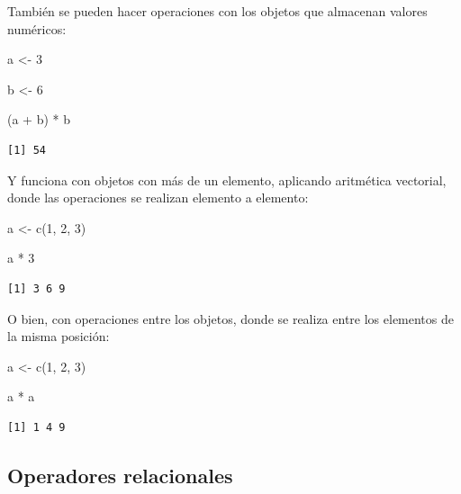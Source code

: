 \documentclass[
  spanish,
  a4paper,
]{scrbook}
\newenvironment{Shaded}{\begin{snugshade}}{\end{snugshade}}
\newcommand{\DecValTok}[1]{\textcolor[rgb]{0.68,0.00,0.00}{#1}}
\newcommand{\FunctionTok}[1]{\textcolor[rgb]{0.28,0.35,0.67}{#1}}
\newcommand{\NormalTok}[1]{\textcolor[rgb]{0.00,0.23,0.31}{#1}}
\newcommand{\OtherTok}[1]{\textcolor[rgb]{0.00,0.23,0.31}{#1}}
\newcommand{\SpecialCharTok}[1]{\textcolor[rgb]{0.37,0.37,0.37}{#1}}
\begin{document}
También se pueden hacer operaciones con los objetos que almacenan
valores numéricos:

\begin{Shaded}
\begin{Highlighting}[]
\NormalTok{a }\OtherTok{\textless{}{-}} \DecValTok{3}

\NormalTok{b }\OtherTok{\textless{}{-}} \DecValTok{6}

\NormalTok{(a }\SpecialCharTok{+}\NormalTok{ b) }\SpecialCharTok{*}\NormalTok{ b}
\end{Highlighting}
\end{Shaded}

\begin{verbatim}
[1] 54
\end{verbatim}

Y funciona con objetos con más de un elemento, aplicando aritmética
vectorial, donde las operaciones se realizan elemento a elemento:

\begin{Shaded}
\begin{Highlighting}[]
\NormalTok{a }\OtherTok{\textless{}{-}} \FunctionTok{c}\NormalTok{(}\DecValTok{1}\NormalTok{, }\DecValTok{2}\NormalTok{, }\DecValTok{3}\NormalTok{)}

\NormalTok{a }\SpecialCharTok{*} \DecValTok{3}
\end{Highlighting}
\end{Shaded}

\begin{verbatim}
[1] 3 6 9
\end{verbatim}

O bien, con operaciones entre los objetos, donde se realiza entre los
elementos de la misma posición:

\begin{Shaded}
\begin{Highlighting}[]
\NormalTok{a }\OtherTok{\textless{}{-}} \FunctionTok{c}\NormalTok{(}\DecValTok{1}\NormalTok{, }\DecValTok{2}\NormalTok{, }\DecValTok{3}\NormalTok{)}

\NormalTok{a }\SpecialCharTok{*}\NormalTok{ a}
\end{Highlighting}
\end{Shaded}

\begin{verbatim}
[1] 1 4 9
\end{verbatim}

\subsection{Operadores relacionales}\label{operadores-relacionales}
\end{document}
